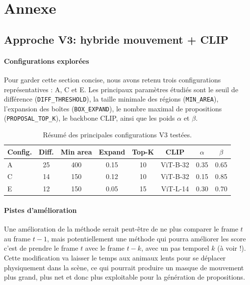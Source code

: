 \documentclass{article}
\begin{document}

\section*{Annexe}
\subsection*{Approche V3: hybride mouvement + CLIP}


\paragraph{Configurations explorées}
Pour garder cette section concise, nous avons retenu trois configurations représentatives : A, C et E. Les principaux paramètres étudiés sont le seuil de différence (\texttt{DIFF\_THRESHOLD}), la taille minimale des régions (\texttt{MIN\_AREA}), l’expansion des boîtes (\texttt{BOX\_EXPAND}), le nombre maximal de propositions (\texttt{PROPOSAL\_TOP\_K}), le backbone CLIP, ainsi que les poids $\alpha$ et $\beta$.

\begin{table}[H]
\centering
\begin{tabular}{lccccccc}
\hline
\textbf{Config.} & \textbf{Diff.} & \textbf{Min area} & \textbf{Expand} & \textbf{Top-K} & \textbf{CLIP} & \boldmath$\alpha$ & \boldmath$\beta$ \\
\hline
A & 25 & 400 & 0.15 & 10 & ViT-B-32 & 0.35 & 0.65 \\
C & 14 & 150 & 0.12 & 10 & ViT-B-32 & 0.15 & 0.85 \\
E & 12 & 150 & 0.05 & 15 & ViT-L-14 & 0.30 & 0.70 \\
\hline
\end{tabular}
\caption{Résumé des principales configurations V3 testées.}
\end{table}
\paragraph{Pistes d’amélioration}
Une amélioration de la méthode serait peut-être de ne plus comparer le frame $t$ au  frame $t-1$, mais potentiellement une méthode qui pourra améliorer les score c'est de prendre le frame $t$ avec le frame $t-k$, avec un pas temporel $k$ (à voir !). Cette modification va laisser le temps aux animaux lents pour se déplacer physiquement dans la scène, ce qui pourrait produire un masque de mouvement plus grand, plus net et donc plus exploitable pour la génération de propositions.
\end{document}
